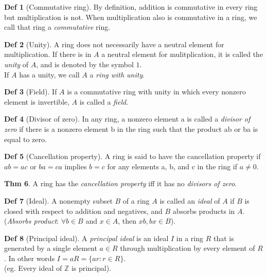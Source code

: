 \documentclass{article}
\theoremstyle{definition}
\newtheorem{definition}{Def}[section]
\newtheorem{theorem}[definition]{Thm}
\begin{document}
\begin{definition}[Commutative ring]
    By definition, addition is commutative in every ring but multiplication is not. When multiplication also is commutative in a ring, we call that ring a \emph{commutative} ring.
\end{definition}

\begin{definition}[Unity]
    A ring does not necessarily have a neutral element for multiplication. If there is in $A$ a neutral element for mulitplication, it is called the \emph{unity} of $A$, and is denoted by the symbol $1$.
    \\
    If $A$ has a unity, we call $A$ a \emph{ring with unity}.
\end{definition}

\begin{definition}[Field]
    If $A$ is a commutative ring with unity in which every nonzero element is invertible, $A$ is called a \emph{field}.
\end{definition}

\begin{definition}[Divisor of zero]
    In any ring, a nonzero element a is called a \emph{divisor of zero} if there is a
    nonzero element b in the ring such that the product ab or ba is equal to
    zero.
\end{definition}

\begin{definition}[Cancellation property]
A ring is said to have the cancellation property if $ab = ac$ or $ba = ca$ implies $b = c$
for any elements a, b, and c in the ring if $a \neq 0$.
\end{definition}

\begin{theorem}
    A ring has the \emph{cancellation property} iff it has no \emph{divisors of zero}.
\end{theorem}

\begin{definition}[Ideal]
    A nonempty subset $B$ of a ring $A$ is called an \emph{ideal} of $A$ if $B$ is closed with respect to addition and negatives, and $B$ absorbs products in $A$.
    \\
    (\emph{Absorbs product}: $\forall b \in B$ and $x \in A$, then $xb, bx \in B$).
\end{definition}

\begin{definition}[Principal ideal]
    A \emph{principal ideal} is an ideal $I$ in a ring $R$ that is generated by a single element $a \in R$ through multiplication by every element of $R$. In other words $I = aR = \{a r : r \in R \}$.
    \\
    (eg. Every ideal of $\mathbb{Z}$ is principal).
\end{definition}
\end{document}
